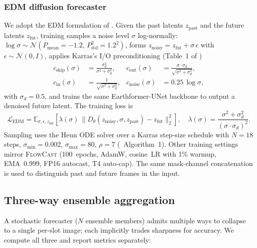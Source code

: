 \documentclass[11pt,a4paper]{article}
\begin{document}
\subsubsection{EDM diffusion forecaster}
\label{sec:diffcast-edm}
We adopt the EDM formulation of \citet{karras2022edm}. Given the past
latents $z_{\text{past}}$ and the future latents $z_{\text{fut}}$, training
samples a noise level $\sigma$ log-normally:
$\log \sigma \sim \mathcal{N}(P_{\text{mean}}=-1.2,\,P_{\text{std}}^2=1.2^2)$,
forms $z_{\text{noisy}} = z_{\text{fut}} + \sigma\,\epsilon$ with
$\epsilon\!\sim\!\mathcal{N}(0,I)$, applies Karras's I/O preconditioning
(Table~1 of \citet{karras2022edm})
\begin{align}
c_{\text{skip}}(\sigma) &= \frac{\sigma_d^2}{\sigma^2 + \sigma_d^2}, &
c_{\text{out}}(\sigma)  &= \frac{\sigma \cdot \sigma_d}{\sqrt{\sigma^2 + \sigma_d^2}}, \\
c_{\text{in}}(\sigma)   &= \frac{1}{\sqrt{\sigma^2 + \sigma_d^2}}, &
c_{\text{noise}}(\sigma) &= 0.25\,\log\sigma,
\end{align}
with $\sigma_d=0.5$, and trains the same {Earthformer-UNet} backbone to
output a denoised future latent. The training loss is
\begin{equation}
\mathcal{L}_{\text{EDM}}
= \mathbb{E}_{\sigma,\epsilon,z_{\text{fut}}}\!\!\left[
\lambda(\sigma)\,\| D_\theta(z_{\text{noisy}}, \sigma, z_{\text{past}}) -
z_{\text{fut}}\|_2^2 \right],
\quad
\lambda(\sigma) = \frac{\sigma^2 + \sigma_d^2}{(\sigma \cdot \sigma_d)^2}.
\end{equation}
Sampling uses the Heun ODE solver over a Karras step-size schedule with
$N=18$ steps, $\sigma_{\min}=0.002$, $\sigma_{\max}=80$, $\rho=7$
(\citet{karras2022edm}~Algorithm~1). Other training settings mirror
\textsc{FlowCast} (100~epochs, AdamW, cosine~LR with 1\% warmup, EMA~0.999,
FP16 autocast, T4 auto-cap). The same mask-channel concatenation is used
to distinguish past and future frames in the input.

\subsection{Three-way ensemble aggregation}
\label{sec:ensemble}
A stochastic forecaster ($N$ ensemble members) admits multiple ways to
collapse to a single per-slot image; each implicitly trades sharpness for
accuracy. We compute all three and report metrics separately:
\end{document}
